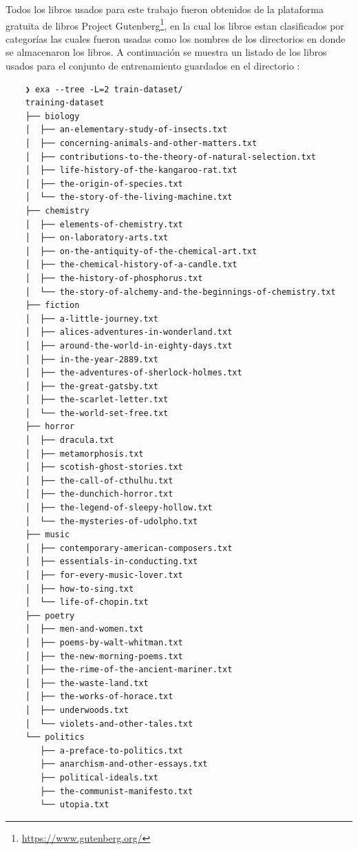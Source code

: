 Todos los libros usados para este trabajo fueron obtenidos de la plataforma gratuita de libros Project Gutenberg\footnote{\url{https://www.gutenberg.org/}}, en la cual los libros estan clasificados por categorías las cuales fueron usadas como los nombres de los directorios en donde se almacenaron los libros. A continuación se muestra un listado de los libros usados para el conjunto de entrenamiento guardados en el directorio :
\begin{verbatim}
    ❯ exa --tree -L=2 train-dataset/
    training-dataset
    ├── biology
    │  ├── an-elementary-study-of-insects.txt
    │  ├── concerning-animals-and-other-matters.txt
    │  ├── contributions-to-the-theory-of-natural-selection.txt
    │  ├── life-history-of-the-kangaroo-rat.txt
    │  ├── the-origin-of-species.txt
    │  └── the-story-of-the-living-machine.txt
    ├── chemistry
    │  ├── elements-of-chemistry.txt
    │  ├── on-laboratory-arts.txt
    │  ├── on-the-antiquity-of-the-chemical-art.txt
    │  ├── the-chemical-history-of-a-candle.txt
    │  ├── the-history-of-phosphorus.txt
    │  └── the-story-of-alchemy-and-the-beginnings-of-chemistry.txt
    ├── fiction
    │  ├── a-little-journey.txt
    │  ├── alices-adventures-in-wonderland.txt
    │  ├── around-the-world-in-eighty-days.txt
    │  ├── in-the-year-2889.txt
    │  ├── the-adventures-of-sherlock-holmes.txt
    │  ├── the-great-gatsby.txt
    │  ├── the-scarlet-letter.txt
    │  └── the-world-set-free.txt
    ├── horror
    │  ├── dracula.txt
    │  ├── metamorphosis.txt
    │  ├── scotish-ghost-stories.txt
    │  ├── the-call-of-cthulhu.txt
    │  ├── the-dunchich-horror.txt
    │  ├── the-legend-of-sleepy-hollow.txt
    │  └── the-mysteries-of-udolpho.txt
    ├── music
    │  ├── contemporary-american-composers.txt
    │  ├── essentials-in-conducting.txt
    │  ├── for-every-music-lover.txt
    │  ├── how-to-sing.txt
    │  └── life-of-chopin.txt
    ├── poetry
    │  ├── men-and-women.txt
    │  ├── poems-by-walt-whitman.txt
    │  ├── the-new-morning-poems.txt
    │  ├── the-rime-of-the-ancient-mariner.txt
    │  ├── the-waste-land.txt
    │  ├── the-works-of-horace.txt
    │  ├── underwoods.txt
    │  └── violets-and-other-tales.txt
    └── politics
       ├── a-preface-to-politics.txt
       ├── anarchism-and-other-essays.txt
       ├── political-ideals.txt
       ├── the-communist-manifesto.txt
       └── utopia.txt
\end{verbatim}

